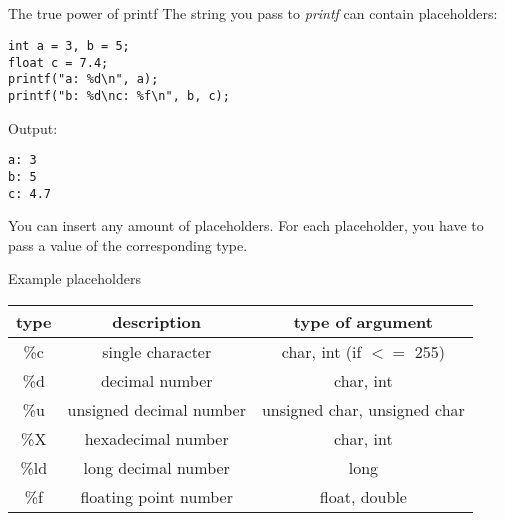 \subsection{}
\begin{frame}[fragile]{The true power of printf}
	The string you pass to \textit{printf} can contain placeholders:
	\begin{lstlisting}[numbers=none]
int a = 3, b = 5;
float c = 7.4;
printf("a: %d\n", a);
printf("b: %d\nc: %f\n", b, c);
\end{lstlisting}
Output:\begin{lstlisting}[numbers=none]
a: 3
b: 5
c: 4.7
\end{lstlisting}
You can insert any amount of placeholders. For each placeholder, you have to pass a value of the corresponding type.
\end{frame}
\begin{frame}{Example placeholders}
	\begin{tabular}{|c|c|c|}
		\hline
		\textbf{type} & \textbf{description} & \textbf{type of argument} \\\hline
		\%c & single character & char, int (if $<=$ 255) \\\hline
		\%d & decimal number & char, int \\\hline
		\%u & unsigned decimal number & unsigned char, unsigned char \\\hline
		\%X & hexadecimal number & char, int \\\hline
		\%ld & long decimal number & long \\\hline
		\%f & floating point number & float, double \\\hline
	\end{tabular}
\end{frame}

